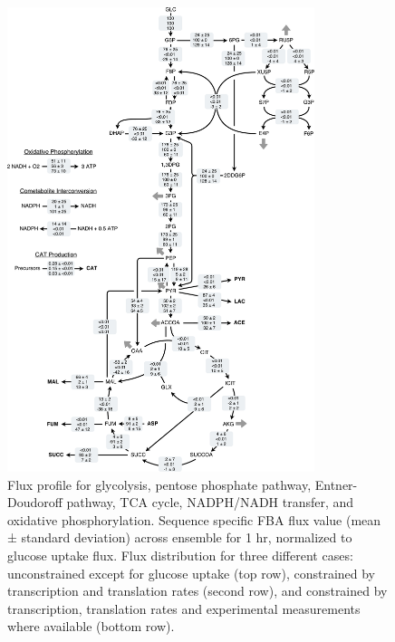 \documentclass[12pt]{article}
\begin{document}
\begin{figure}[ht]
\centering
\includegraphics[width=0.8\textwidth]{./Figures/CAT_flux_final.pdf}
\caption{Flux profile for glycolysis, pentose phosphate pathway, Entner-Doudoroff pathway, TCA cycle, NADPH/NADH transfer, and oxidative phosphorylation. Sequence specific FBA flux value (mean ± standard deviation) across ensemble for 1 hr, normalized to glucose uptake flux. Flux distribution for three different cases: unconstrained except for glucose uptake (top row), constrained by transcription and translation rates (second row), and constrained by transcription, translation rates and experimental measurements where available (bottom row).}
\label{fig:Network}
\end{figure}

\clearpage

\renewcommand\thefigure{S\arabic{figure}}
\renewcommand\thetable{T\arabic{table}}
\renewcommand\thepage{S-\arabic{page}}
\renewcommand\theequation{S\arabic{equation}}

\setcounter{equation}{0}
\setcounter{table}{0}
\setcounter{figure}{0}
\setcounter{page}{1}

\end{document}
